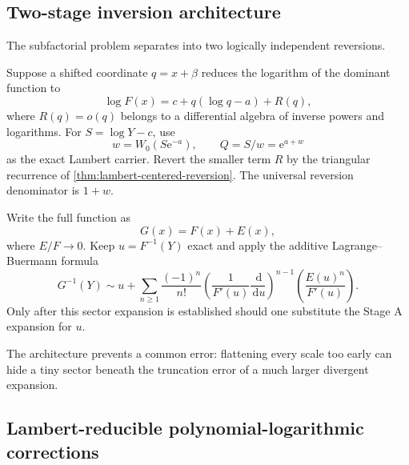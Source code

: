 \documentclass[11pt]{article}
\numberwithin{equation}{section}
\theoremstyle{mainthm}
\theoremstyle{defstyle}
\theoremstyle{remark}
\newcommand{\e}{\mathrm e}
\newcommand{\dd}{\,\mathrm d}
\begin{document}
\subsection{Two-stage inversion architecture}

The subfactorial problem separates into two logically independent reversions.

\begin{methodbox}
Suppose a shifted coordinate \(q=x+\beta\) reduces the logarithm of the dominant function to
\begin{equation}\label{eq:dominant-general-log}
 \log F(x)=c+q(\log q-a)+R(q),
\end{equation}
where \(R(q)=o(q)\) belongs to a differential algebra of inverse powers and logarithms.  For \(S=\log Y-c\), use
\begin{equation}\label{eq:dominant-general-W}
 w=W_0(S\e^{-a}),\qquad Q=S/w=\e^{a+w}
\end{equation}
as the exact Lambert carrier.  Revert the smaller term \(R\) by the triangular recurrence of \cref{thm:lambert-centered-reversion}.  The universal reversion denominator is \(1+w\).
\end{methodbox}

\begin{methodbox}
Write the full function as
\begin{equation}\label{eq:general-full-G}
 G(x)=F(x)+E(x),
\end{equation}
where \(E/F\to0\).  Keep \(u=F^{-1}(Y)\) exact and apply the additive Lagrange--Buermann formula
\begin{equation}\label{eq:general-stage-B}
 G^{-1}(Y)
 \sim u+\sum_{n\ge1}\frac{(-1)^n}{n!}
 \left(\frac1{F'(u)}\frac{\dd}{\dd u}\right)^{n-1}
 \left(\frac{E(u)^n}{F'(u)}\right).
\end{equation}
Only after this sector expansion is established should one substitute the Stage A expansion for \(u\).
\end{methodbox}

The architecture prevents a common error: flattening every scale too early can hide a tiny sector beneath the truncation error of a much larger divergent expansion.

\subsection{Lambert-reducible polynomial-logarithmic corrections}
\end{document}
